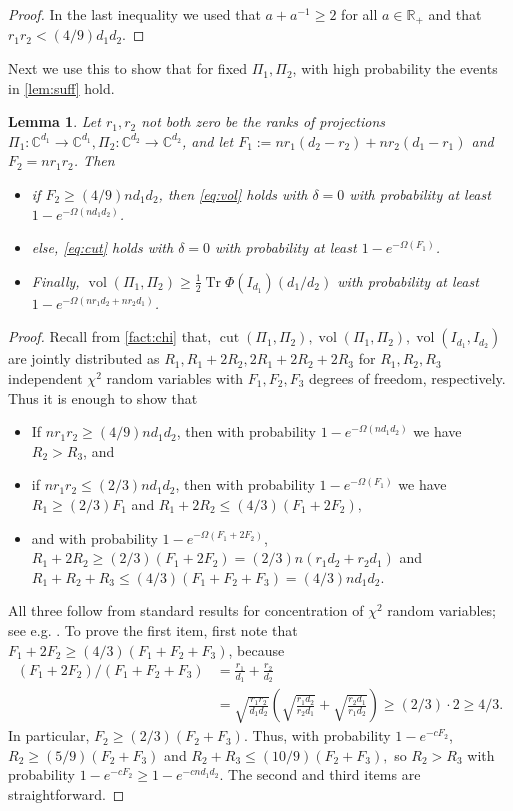 \documentclass[aos]{imsart}
\newtheorem{lemma}[theorem]{Lemma}
\theoremstyle{definition}
\DeclareMathOperator{\vol}{vol}
\DeclareMathOperator{\cut}{cut}
\DeclareMathOperator{\tr}{Tr}
\newcommand{\R}{{\mathbb{R}}}
\newcommand{\C}{{\mathbb{C}}}
\begin{document}
\begin{appendix}
\begin{proof}
In the last inequality we used that $a + a^{-1} \geq 2$ for all $a \in \R_+$ and that $r_1 r_2 < (4/9) d_1 d_2$. \end{proof}


Next we use this to show that for fixed $\Pi_1, \Pi_2$, with high probability the events in \cref{lem:suff} hold.
\begin{lemma}\label{lem:probabilities}
Let $r_1, r_2$ not both zero be the ranks of projections $\Pi_1: \C^{d_1} \to \C^{d_1}, \Pi_2: \C^{d_2} \to \C^{d_2}$, and let $F_1:= n r_1(d_2 - r_2) + n r_2(d_1-r_1)$ and $F_2 = n r_1 r_2$. Then
\begin{itemize}
\item if $F_2 \geq (4/9) n d_1 d_2$, then \cref{eq:vol} holds with $\delta = 0$ with probability at least $1 - e^{-\Omega( n d_1 d_2)}$.
\item else, \cref{eq:cut} holds with $\delta = 0$ with probability at least $1 - e^{-\Omega( F_1)}$.
\item Finally, $\vol(\Pi_1, \Pi_2) \geq \frac{1}{2}\tr \Phi(I_{d_1}) (d_1/d_2)$ with probability at least $1 - e^{- \Omega(n r_1 d_2 + n r_2 d_1)}$.
\end{itemize}
\end{lemma}


\begin{proof}
Recall from \cref{fact:chi} that, $\cut(\Pi_1, \Pi_2), \vol(\Pi_1, \Pi_2), \vol(I_{d_1}, I_{d_2})$ are jointly distributed as $R_1, R_1 + 2R_2, 2R_1 + 2R_2 + 2R_3$ for $R_1, R_2, R_3$ independent $\chi^2$ random variables with $F_1, F_2, F_3$ degrees of freedom, respectively. Thus it is enough to show that
\begin{itemize}
\item If $nr_1 r_2 \geq (4/9) n d_1 d_2$, then with probability $1 - e^{- \Omega( n d_1 d_2)}$ we have $R_2 > R_3$, and
\item if $nr_1 r_2 \leq (2/3) n d_1 d_2$, then with probability $1 - e^{- \Omega(F_1)}$ we have $R_1 \geq (2/3) F_1$ and $R_1 + 2R_2 \leq (4/3) (F_1 + 2 F_2),$
\item and with probability $1 - e^{- \Omega(F_1 + 2 F_2)}$, $R_1 + 2R_2 \geq (2/3) (F_1 + 2 F_2) = (2/3) n (r_1 d_2 + r_2 d_1)$ and $R_1 + R_2 + R_3 \leq (4/3)(F_1 + F_2 + F_3) = (4/3)n d_1 d_2$.
\end{itemize}
All three follow from standard results for concentration of $\chi^2$ random variables; see e.g. \cite{W19}. To prove the first item, first note that $F_1 + 2 F_2 \geq (4/3)(F_1 + F_2 + F_3)$, because
\begin{align*}
(F_1 + 2 F_2)/( F_1 + F_2 + F_3) &= \frac{r_1}{d_1} + \frac{r_2}{d_2}\\
 &= \sqrt{ \frac{r_1 r_2}{d_1 d_2}}\left( \sqrt{ \frac{r_1 d_2}{r_2 d_1}} + \sqrt{ \frac{r_2 d_1}{r_1 d_2}}\right) \geq (2/3) \cdot 2 \geq 4/3.
\end{align*}
In particular, $F_2 \geq (2/3)(F_2 + F_3)$. Thus, with probability $1 - e^{- c F_2}$, $R_2 \geq (5/9) (F_2 + F_3)$ and $R_2 + R_3 \leq (10/9) (F _2 + F_3),$ so $R_2 > R_3$ with probability $1 - e^{- c F_2} \geq 1 - e^{- c n d_1 d_2}$. The second and third items are straightforward.
\end{proof}


\end{appendix}
\end{document}
